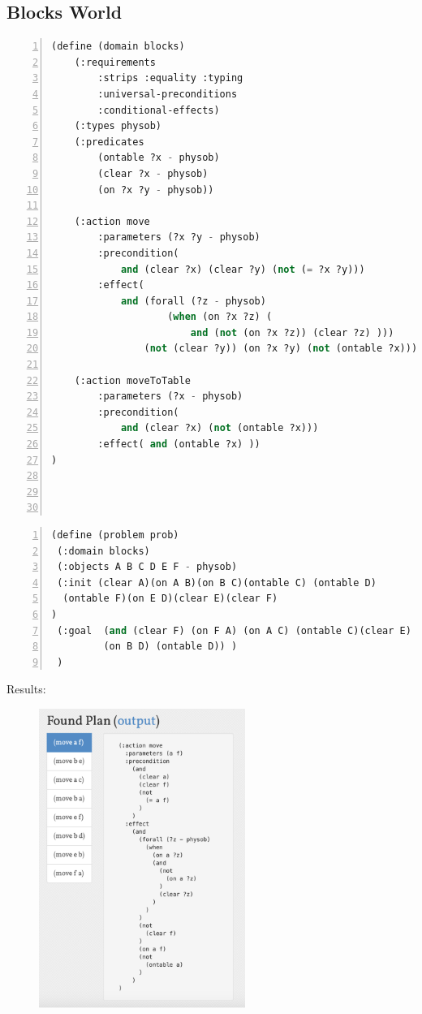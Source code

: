 \documentclass[a4paper, 11pt]{article}
\begin{document}
\subsection{Blocks World}

\begin{lstlisting}[title=domain\_blocks.pddl,frame=single,language=lisp,numbers=left]
(define (domain blocks)
    (:requirements
        :strips :equality :typing
        :universal-preconditions
        :conditional-effects)
    (:types physob)
    (:predicates 
        (ontable ?x - physob)
        (clear ?x - physob)
        (on ?x ?y - physob))
        
    (:action move
        :parameters (?x ?y - physob)
        :precondition(
            and (clear ?x) (clear ?y) (not (= ?x ?y)))
        :effect(
            and (forall (?z - physob)
                    (when (on ?x ?z) (
                        and (not (on ?x ?z)) (clear ?z) ))) 
                (not (clear ?y)) (on ?x ?y) (not (ontable ?x))))
                
    (:action moveToTable
        :parameters (?x - physob)
        :precondition(
            and (clear ?x) (not (ontable ?x)))
        :effect( and (ontable ?x) ))
)




\end{lstlisting}

\label{sec:problem-description}

\begin{lstlisting}[title=blocks.pddl,frame=single,language=lisp,numbers=left]
(define (problem prob)
 (:domain blocks)
 (:objects A B C D E F - physob)
 (:init (clear A)(on A B)(on B C)(ontable C) (ontable D)
  (ontable F)(on E D)(clear E)(clear F)
)
 (:goal  (and (clear F) (on F A) (on A C) (ontable C)(clear E) (on E B) 
         (on B D) (ontable D)) )
 )

\end{lstlisting}
Results:
\begin{figure}[ht]
  \centering
  \includegraphics[width=0.6\textwidth]{Pic/2}
  \qquad

\end{figure}

%
%
\end{document}
